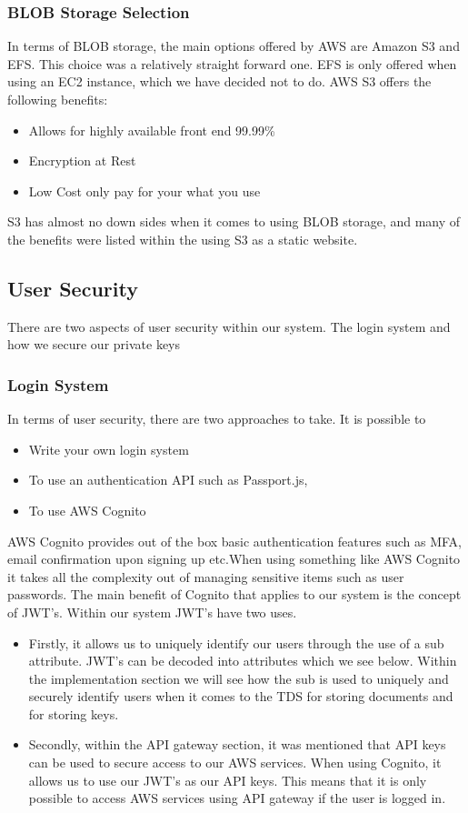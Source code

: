 \documentclass[runningheads]{llncs}
\begin{document}
\subsubsection{BLOB Storage Selection}
In terms of BLOB storage, the main options offered by AWS are Amazon S3 and EFS. This choice was a relatively straight forward one. EFS is only offered when using an EC2 instance, which we have decided not to do. AWS S3 offers the following benefits:

\begin{itemize}
	\item Allows for highly available front end 99.99\%
	\item Encryption at Rest
	\item Low Cost only pay for your what you use
\end{itemize}

S3 has almost no down sides when it comes to using BLOB storage, and many of the benefits were listed within the using S3 as a static website.

\subsection{User Security}
There are two aspects of user security within our system. The login system and how we secure our private keys

\subsubsection{Login System}
In terms of user security, there are two approaches to take. It is possible to
\begin{itemize}
	\item Write your own login system
	\item To use an authentication API such as Passport.js,
	\item To use AWS Cognito
\end{itemize}

AWS Cognito provides out of the box basic authentication features such as MFA, email confirmation upon signing up etc.When using something like AWS Cognito it takes all the complexity out of managing sensitive items such as user passwords. The main benefit of Cognito that applies to our system is the concept of JWT's. Within our system JWT's have two uses.

\begin{itemize}
	\item Firstly, it allows us to uniquely identify our users through the use of a sub attribute. JWT's can be decoded into attributes which we see below. Within the implementation section we will see how the sub is used to uniquely and securely identify users when it comes to the TDS for storing documents and for storing keys.
	\item Secondly, within the API gateway section, it was mentioned that API keys can be used to secure access to our AWS services. When using Cognito, it allows us to use our JWT's as our API keys. This means that it is only possible to access AWS services using API gateway if the user is logged in.
\end{itemize}
\end{document}

